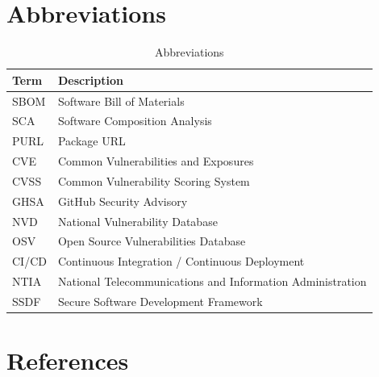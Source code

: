 
\section{Abbreviations}

\begin{table}[H]
\centering
\small
\renewcommand{\arraystretch}{1.3}

\begin{tabular}{p{3cm}p{10cm}}
\toprule
\rowcolor{ZWPrimary}
\textbf{\color{white}Term} & \textbf{\color{white}Description} \\
\midrule
SBOM & Software Bill of Materials \\
SCA & Software Composition Analysis \\
PURL & Package URL \\
CVE & Common Vulnerabilities and Exposures \\
CVSS & Common Vulnerability Scoring System \\
GHSA & GitHub Security Advisory \\
NVD & National Vulnerability Database \\
OSV & Open Source Vulnerabilities Database \\
CI/CD & Continuous Integration / Continuous Deployment \\
NTIA & National Telecommunications and Information Administration \\
SSDF & Secure Software Development Framework \\
\bottomrule
\end{tabular}
\caption{Abbreviations}
\end{table}

\vspace{0.4cm}

\newpage
\section{References}

